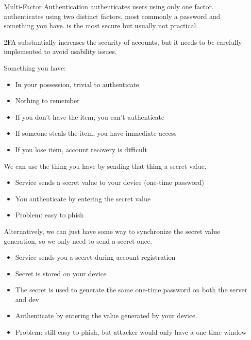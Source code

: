 \begin{dfnbox}{Multi-Factor Authentication}{}
     authenticates users using only one factor.  authenticates using two distinct factors, most commonly a password and something you have.  is the most secure but usually not practical.
\end{dfnbox}

2FA substantially increases the security of accounts, but it needs to be carefully implemented to avoid usability issues.

Something you have:
\begin{itemize}[noitemsep]
    \item In your possession, trivial to authenticate
    \item Nothing to remember
    \item If you don't have the item, you can't authenticate
    \item If someone steals the item, you have immediate access
    \item If you lose item, account recovery is difficult
\end{itemize}

We can use the thing you have by sending that thing a secret value.
\begin{itemize}[noitemsep]
    \item Service sends a secret value to your device (one-time password)
    \item You authenticate by entering the secret value
    \item Problem: easy to phish
\end{itemize}

Alternatively, we can just have some way to synchronize the secret value generation, so we only need to send a secret once.
\begin{itemize}[noitemsep]
    \item Service sends you a secret during account registration
    \item Secret is stored on your device
    \item The secret is used to generate the same one-time password on both the server and dev
    \item Authenticate by entering the value generated by your device.
    \item Problem: still easy to phish, but attacker would only have a one-time window
\end{itemize}

